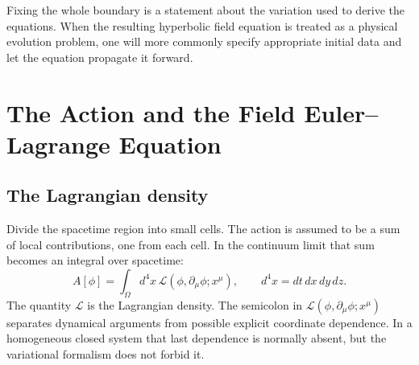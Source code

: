 \begin{classroomqa}
\end{classroomqa}

\begin{classroomqa}
\end{classroomqa}

Fixing the whole boundary is a statement about the variation used to derive the
equations.  When the resulting hyperbolic field equation is treated as a
physical evolution problem, one will more commonly specify appropriate initial
data and let the equation propagate it forward.

\section{The Action and the Field Euler--Lagrange Equation}

\subsection{The Lagrangian density}

Divide the spacetime region into small cells.  The action is assumed to be a
sum of local contributions, one from each cell.  In the continuum limit that
sum becomes an integral over spacetime:
\begin{equation}
A[\phi]
=
\int_{\Omega} d^4x\,
\mathcal{L}\!\left(
\phi,\partial_\mu\phi;x^\mu
\right),
\qquad
d^4x=dt\,dx\,dy\,dz.
\label{eq:sr4-field-action}
\end{equation}
The quantity \(\mathcal{L}\) is the Lagrangian density.  The semicolon in
\(\mathcal{L}(\phi,\partial_\mu\phi;x^\mu)\) separates dynamical arguments from
possible explicit coordinate dependence.  In a homogeneous closed system that
last dependence is normally absent, but the variational formalism does not
forbid it.

